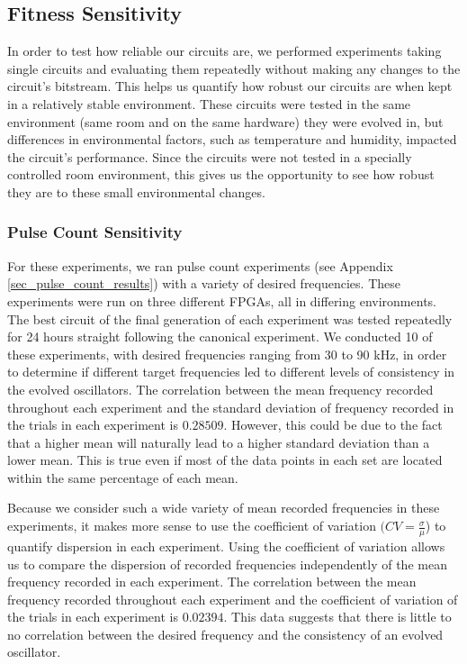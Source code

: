 \documentclass{ieeeaccess}
\begin{document}
\subsection{Fitness Sensitivity}
\label{sec_results_sensitivity}
In order to test how reliable our circuits are, we performed experiments taking single circuits and evaluating them repeatedly without making any changes to the circuit's bitstream. This helps us quantify how robust our circuits are when kept in a relatively stable environment. These circuits were tested in the same environment (same room and on the same hardware) they were evolved in, but differences in environmental factors, such as temperature and humidity, impacted the circuit’s performance. Since the circuits were not tested in a specially controlled room environment, this gives us the opportunity to see how robust they are to these small environmental changes.


\subsubsection{Pulse Count Sensitivity}
For these experiments, we ran pulse count experiments (see Appendix \ref{sec_pulse_count_results}) with a variety of desired frequencies. These experiments were run on three different FPGAs, all in differing environments. The best circuit of the final generation of each experiment was tested repeatedly for 24 hours straight following the canonical experiment. We conducted 10 of these experiments, with desired frequencies ranging from 30 to 90 kHz, in order to determine if different target frequencies led to different levels of consistency in the evolved oscillators. The correlation between the mean frequency recorded throughout each experiment and the standard deviation of frequency recorded in the trials in each experiment is $0.28509$. However, this could be due to the fact that a higher mean will naturally lead to a higher standard deviation than a lower mean. This is true even if most of the data points in each set are located within the same percentage of each mean. 

Because we consider such a wide variety of mean recorded frequencies in these experiments, it makes more sense to use the coefficient of variation $(CV = \frac{\sigma}{\mu}$) to quantify dispersion in each experiment. Using the coefficient of variation allows us to compare the dispersion of recorded frequencies independently of the mean frequency recorded in each experiment. The correlation between the mean frequency recorded throughout each experiment and the coefficient of variation of the trials in each experiment is $0.02394$. 
This data suggests that there is little to no correlation between the desired frequency and the consistency of an evolved oscillator. 
\end{document}
